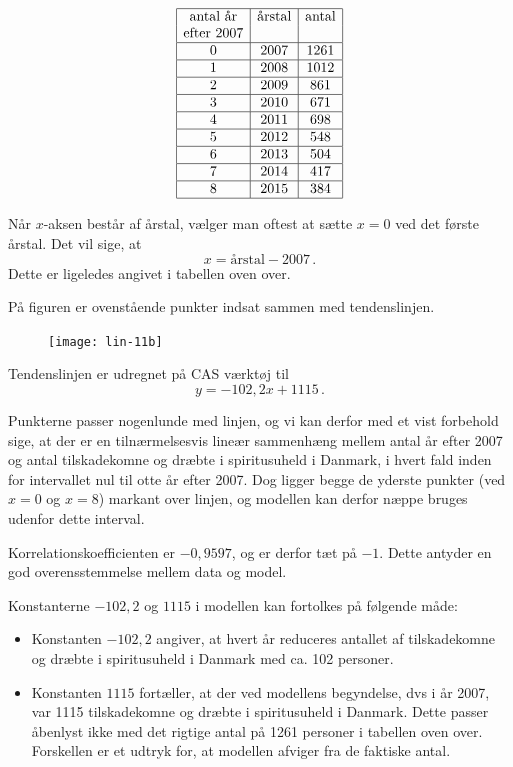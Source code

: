 \documentclass[12pt,oneside,a4paper]{article}
\begin{document}
\[
\begin{array}{|c|c|c|}
    \hline
    \mbox{antal år} & \mbox{årstal} & \mbox{antal} \\
    \mbox{efter 2007} & &  \\
    \hline
    0 & 2007 & 1261 \\
    \hline
    1 & 2008 & 1012 \\
    \hline
    2 & 2009 & 861 \\
    \hline
    3 & 2010 & 671 \\
    \hline
    4 & 2011 & 698 \\
    \hline
    5 & 2012 & 548 \\
    \hline
    6 & 2013 & 504 \\
    \hline
    7 & 2014 & 417 \\
    \hline
    8 & 2015 & 384 \\
    \hline
\end{array}
\]

Når $x$-aksen består af årstal, vælger man oftest at sætte $x=0$ ved
det første årstal.  Det vil sige, at
\[
    x = \mbox{årstal} - 2007\,.
\]
Dette er ligeledes angivet i tabellen oven over.

På figuren er ovenstående punkter indsat sammen med tendenslinjen.

\begin{figure}[H]
    \centering
    \texttt{[image: lin-11b]}
    \caption{}
\end{figure}

Tendenslinjen er udregnet på CAS værktøj til
\[
    y=-102,2x+1115 \,.
\]

Punkterne passer nogenlunde med linjen, og vi kan derfor med et vist forbehold
sige, at der er en tilnærmelsesvis lineær sammenhæng mellem antal år efter 2007
og antal tilskadekomne og dræbte i spiritusuheld i Danmark, i hvert fald inden
for intervallet nul til otte år efter 2007.  Dog ligger begge de yderste
punkter (ved $x=0$ og $x=8$) markant over linjen, og modellen kan derfor næppe
bruges udenfor dette interval.

Korrelationskoefficienten er $-0,9597$, og er derfor tæt på $-1$. Dette antyder
en god overensstemmelse mellem data og model.

Konstanterne $-102,2$ og $1115$ i modellen kan fortolkes på følgende måde:
\begin{itemize}
    \item Konstanten $-102,2$ angiver, at hvert år reduceres antallet af
        tilskadekomne og dræbte i spiritusuheld i Danmark med ca. 102 personer.
    \item Konstanten $1115$ fortæller, at der ved modellens begyndelse, dvs i
        år 2007, var 1115 tilskadekomne og dræbte i spiritusuheld i Danmark.
        Dette passer åbenlyst ikke med det rigtige antal på 1261 personer i
        tabellen oven over. Forskellen er et udtryk for, at modellen afviger
        fra de faktiske antal.
\end{itemize}
\end{document}
